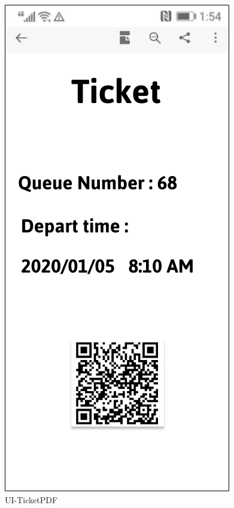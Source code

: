 \documentclass[a4paper,12pt]{report}
\begin{document}
\begin{figure}[H]
\begin{minipage}[t]{0.56\linewidth}
		\includegraphics[scale=0.5]{UI-TicketPDF}
		\caption{UI-TicketPDF}
		\label{fig:UI-TicketPDF}
	\end{minipage}
\end{figure}
\end{document}

